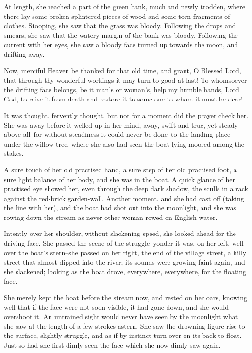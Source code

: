 At length, she reached a part of the green bank, much and newly trodden,
where there lay some broken splintered pieces of wood and some torn
fragments of clothes. Stooping, she saw that the grass was bloody.
Following the drops and smears, she saw that the watery margin of the
bank was bloody. Following the current with her eyes, she saw a bloody
face turned up towards the moon, and drifting away.

Now, merciful Heaven be thanked for that old time, and grant, O Blessed
Lord, that through thy wonderful workings it may turn to good at last!
To whomsoever the drifting face belongs, be it man’s or woman’s, help
my humble hands, Lord God, to raise it from death and restore it to some
one to whom it must be dear!

It was thought, fervently thought, but not for a moment did the prayer
check her. She was away before it welled up in her mind, away, swift
and true, yet steady above all--for without steadiness it could never
be done--to the landing-place under the willow-tree, where she also had
seen the boat lying moored among the stakes.

A sure touch of her old practised hand, a sure step of her old practised
foot, a sure light balance of her body, and she was in the boat. A
quick glance of her practised eye showed her, even through the deep dark
shadow, the sculls in a rack against the red-brick garden-wall. Another
moment, and she had cast off (taking the line with her), and the boat
had shot out into the moonlight, and she was rowing down the stream as
never other woman rowed on English water.

Intently over her shoulder, without slackening speed, she looked ahead
for the driving face. She passed the scene of the struggle--yonder it
was, on her left, well over the boat’s stern--she passed on her right,
the end of the village street, a hilly street that almost dipped into
the river; its sounds were growing faint again, and she slackened;
looking as the boat drove, everywhere, everywhere, for the floating
face.

She merely kept the boat before the stream now, and rested on her oars,
knowing well that if the face were not soon visible, it had gone down,
and she would overshoot it. An untrained sight would never have seen by
the moonlight what she saw at the length of a few strokes astern. She
saw the drowning figure rise to the surface, slightly struggle, and as
if by instinct turn over on its back to float. Just so had she first
dimly seen the face which she now dimly saw again.

